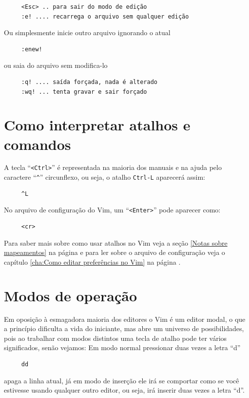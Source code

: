 \documentclass[10pt,a4paper,openany]{book}
\begin{document}
\begin{verbatim}
     <Esc> .. para sair do modo de edição
     :e! .... recarrega o arquivo sem qualquer edição
\end{verbatim}

Ou simplesmente inicie outro arquivo ignorando o atual

\begin{verbatim}
     :enew!
\end{verbatim}

ou saia do arquivo sem modifica-lo

\begin{verbatim}
     :q! .... saída forçada, nada é alterado
     :wq! ... tenta gravar e sair forçado
\end{verbatim}

\section{Como interpretar atalhos e comandos}\label{Como interpretar atalhos e comandos}

A tecla ``\verb|<Ctrl>|'' é representada na maioria dos manuais e na ajuda
pelo caractere ``\verb|^|'' circunflexo, ou seja, o atalho \verb|Ctrl-L| aparecerá assim:

\begin{verbatim}
     ^L
\end{verbatim}

No arquivo de configuração do Vim, um ``\verb|<Enter>|'' pode aparecer como:

\begin{verbatim}
     <cr>
\end{verbatim}

Para saber mais sobre como usar atalhos no Vim veja a seção \ref{Notas sobre
mapeamentos} na página \pageref{Notas sobre mapeamentos} e para ler sobre o
arquivo de configuração veja o capítulo \ref{cha:Como editar preferências no Vim} na página
\pageref{cha:Como editar preferências no Vim}.


\section{Modos de operação}\label{Modos de operação}

Em oposição à esmagadora maioria dos editores o Vim é um editor modal, o que a
princípio dificulta a vida do iniciante, mas abre um universo de
possibilidades, pois ao trabalhar com modos distintos uma tecla de
atalho pode ter vários significados, senão vejamos:
Em modo normal pressionar duas vezes a letra ``d''
\begin{verbatim}
     dd
\end{verbatim}
apaga a linha atual, já em modo de inserção ele irá se comportar como se você estivesse
usando qualquer outro editor, ou seja, irá inserir duas vezes a letra ``d''.
\end{document}
